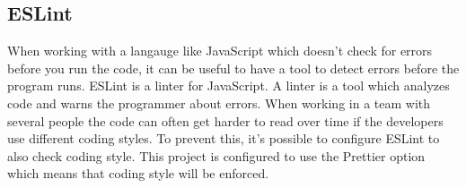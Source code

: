 \subsection{ESLint}
When working with a langauge like JavaScript which doesn't check for errors before you run the code, it can be useful to have a tool to detect errors before the program runs. ESLint\cite{eslint} is a linter for JavaScript. A linter is a tool which analyzes code and warns the programmer about errors. When working in a team with several people the code can often get harder to read over time if the developers use different coding styles. To prevent this, it's possible to configure ESLint to also check coding style. This project is configured to use the Prettier\cite{prettier} option which means that coding style will be enforced. 